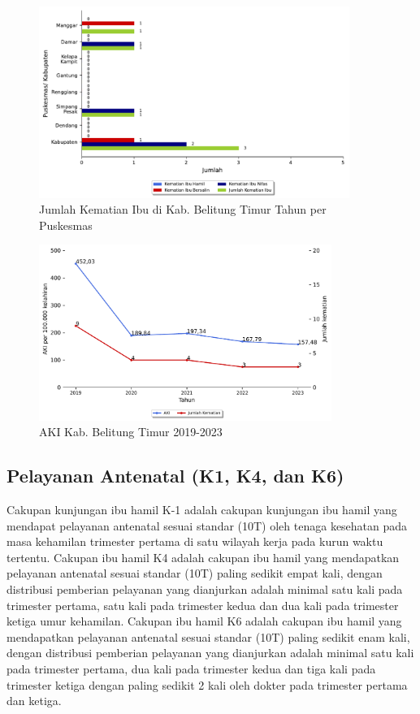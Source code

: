 \begin{figure}[H]
    \centering{}
    \includegraphics[width=0.9\textwidth]{bab_05/bab_05_01_kematianIbu}
    \caption{Jumlah Kematian Ibu di Kab. Belitung Timur Tahun \tP per Puskesmas}
    \label{fig:Jumlah-Kematian-Ibu}
\end{figure}

\begin{figure}[H]
    \centering{}
    \includegraphics[width=0.85\textwidth]{bab_05/bab_05_02_plotAKI}
    \caption{AKI Kab. Belitung Timur 2019-2023}
    \label{fig:AKI-2019-2023}
\end{figure}

\subsection{Pelayanan Antenatal (K1, K4, dan K6)}
Cakupan kunjungan ibu hamil K-1 adalah cakupan kunjungan ibu hamil yang mendapat pelayanan antenatal sesuai standar (10T) oleh tenaga kesehatan pada masa kehamilan trimester
pertama di satu wilayah kerja pada kurun waktu tertentu. Cakupan ibu hamil K4 adalah cakupan ibu hamil yang mendapatkan pelayanan antenatal sesuai standar (10T) paling sedikit empat kali, dengan distribusi pemberian pelayanan yang dianjurkan adalah minimal satu kali pada trimester pertama, satu kali pada trimester kedua dan dua kali pada trimester ketiga umur kehamilan. Cakupan ibu hamil K6 adalah cakupan ibu hamil yang mendapatkan pelayanan antenatal sesuai standar (10T) paling sedikit enam kali, dengan distribusi pemberian pelayanan yang dianjurkan adalah minimal satu kali pada trimester pertama, dua kali pada trimester kedua dan tiga kali pada trimester ketiga dengan paling sedikit 2 kali oleh dokter pada trimester pertama dan ketiga.


